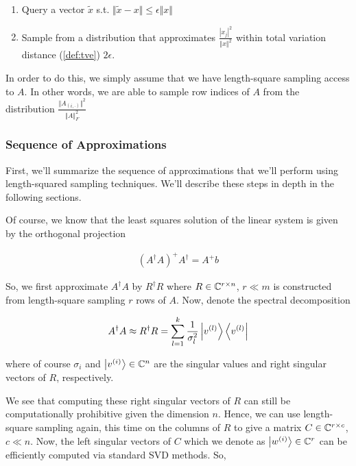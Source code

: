 \documentclass[main.tex]{subfiles}
\begin{document}
{\begin{enumerate}
\item Query a vector $\tilde{x}$ s.t. $\Vert \tilde{x} - x \Vert \leq \epsilon \Vert x \Vert$
\item Sample from a distribution that approximates $\frac{|x_j|^2}{\Vert x \Vert^2}$ within total variation distance (\autoref{def:tve}) $2\epsilon$.
\end{enumerate}

In order to do this, we simply assume that we have length-square sampling access to $A$. In other words, we are able to sample row indices of $A$ from the distribution $\frac{\Vert A_{(i, \cdot)}\Vert^2}{\Vert A \Vert^2_F}$

\subsubsection{Sequence of Approximations}

First, we'll summarize the sequence of approximations that we'll perform using length-squared sampling techniques. We'll describe these steps in depth in the following sections.

Of course, we know that the least squares solution of the linear system is given by the orthogonal projection

\begin{align*}
	(A^\dag A)^+ A^\dag = A^+ b
\end{align*}

So, we first approximate $A^\dag A$ by $R^\dag R$ where $R \in \mathbb{C}^{r \times n}$, $r \ll m$ is constructed from length-square sampling $r$ rows of $A$. Now, denote the spectral decomposition 

\begin{align*}
A^\dag A \approx R^\dag R = \sum_{l=1}^k \frac{1}{\sigma_l^2}\ket{v^{(l)}}\bra{v^{(l)}}
\end{align*}

where of course $\sigma_i$ and $\ket{v^{(i)}} \in \mathbb{C}^n$ are the singular values and right singular vectors of $R$, respectively.

We see that computing these right singular vectors of $R$ can still be computationally prohibitive given the dimension $n$. Hence, we can use length-square sampling again, this time on the columns of $R$ to give a matrix $C \in \mathbb{C}^{r \times c}$, $c \ll n$. Now, the left singular vectors of $C$ which we denote as $\ket{w^{(i)}} \in \mathbb{C}^r$ can be efficiently computed via standard SVD methods. So,

}
\end{document}
